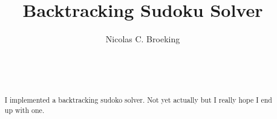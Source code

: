 \documentclass{sig-alternate}
\begin{document}
%

\title{Backtracking Sudoku Solver}
%
%
%
%
%

%
\author{
%
%
\alignauthor
Nicolas C. Broeking\\
       \\
       \\
       \\
}


\maketitle
\begin{abstract}
I implemented a backtracking sudoko solver. Not yet actually but I really hope I end up with one. 
\end{abstract}
\end{document}

